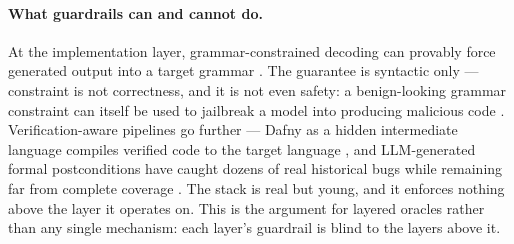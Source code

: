 \documentclass[11pt,a4paper,twocolumn]{article}
\begin{document}
\paragraph{What guardrails can and cannot do.} At the
implementation layer, grammar-constrained decoding can provably
force generated output into a target grammar
\citep{park2025gcd}. The guarantee is syntactic only ---
constraint is not correctness, and it is not even safety: a
benign-looking grammar constraint can itself be used to jailbreak
a model into producing malicious code
\citep{zhang2026gcdjailbreak}. Verification-aware pipelines go
further --- Dafny as a hidden intermediate language compiles
verified code to the target language \citep{li2025dafny}, and
LLM-generated formal postconditions have caught dozens of real
historical bugs while remaining far from complete coverage
\citep{endres2024postconditions}. The stack is real but young,
and it enforces nothing above the layer it operates on. This is
the argument for layered oracles rather than any single
mechanism: each layer's guardrail is blind to the layers above
it.
\end{document}
